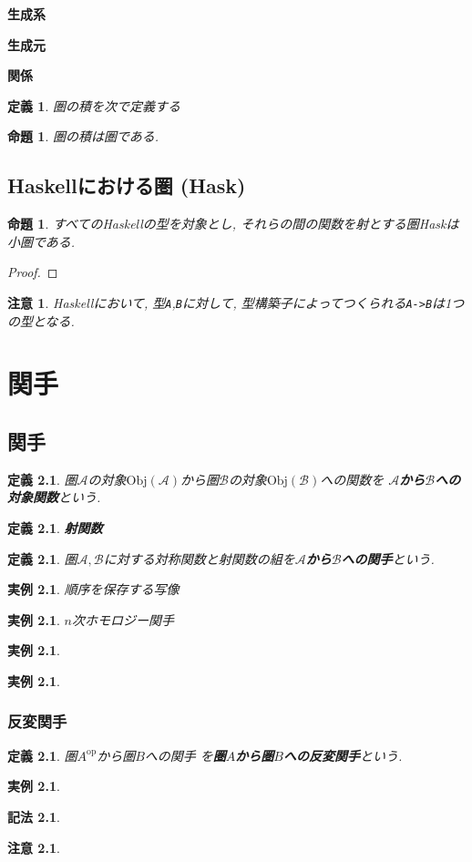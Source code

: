 \documentclass[dvipdfmx]{jsbook}
\theoremstyle{plain}
\newtheorem{Def}[thm]{定義}
\newtheorem{Notation}[thm]{記法}
\newtheorem{Prop}[thm]{命題}
\newtheorem{caution}[thm]{注意}
\newtheorem{example}[thm]{実例}
\begin{document}
{\bf 生成系}

{\bf 生成元}

{\bf 関係}

\begin{Def}
圏の積を次で定義する
\end{Def}
\begin{Prop}
圏の積は圏である.
\end{Prop}
\section{Haskellにおける圏 (Hask)}
\begin{Prop}
すべてのHaskellの型を対象とし, それらの間の関数を射とする圏Haskは小圏である.
\end{Prop}
\begin{proof}
\end{proof}
\begin{caution}
Haskellにおいて, 型\verb|A|,\verb|B|に対して, 型構築子によってつくられる\verb|A->B|は1つの型となる.
\end{caution}
\chapter{関手}
\section{関手}
\begin{Def}
圏$\mathscr{A}$の対象$\mathrm{Obj}(\mathscr{A})$から圏$\mathscr{B}$の対象$\mathrm{Obj}(\mathscr{B})$への関数を
{\bf $\mathscr{A}$から$\mathscr{B}$への対象関数}という.
\end{Def}
\begin{Def}
{\bf 射関数}
\end{Def}
\begin{Def}
圏$\mathscr{A},\mathscr{B}$に対する対称関数と射関数の組を{\bf $\mathscr{A}$から$\mathscr{B}$への関手}という.
\end{Def}
\begin{example}
順序を保存する写像
\end{example}
\begin{example}
$n$次ホモロジー関手
\end{example}
\begin{example}
\end{example}
\begin{example}
\end{example}
\subsection{反変関手}
\begin{Def}
圏$A^{\mathrm{op}}$から圏$B$への関手
を{\bf 圏$A$から圏$B$への反変関手}という.
\end{Def}
\begin{example}
\end{example}
\begin{Notation}
\end{Notation}
\begin{caution}
\end{caution}
\end{document}
